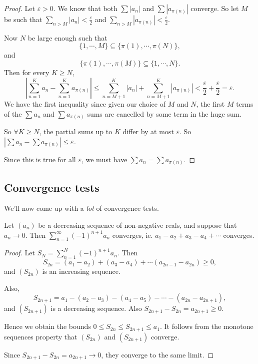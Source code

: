 \documentclass[a4paper]{article}
\begin{document}
\begin{proof}
  Let $\varepsilon > 0$. We know that both $\sum |a_n|$ and $\sum|a_{\pi(n)}|$ converge. So let $M$ be such that $\sum_{n > M}|a_n| < \frac{\varepsilon}{2}$ and $\sum_{n > M}|a_{\pi(n)}| < \frac{\varepsilon}{2}$.

  Now $N$ be large enough such that
  \[
    \{1, \cdots, M\}\subseteq \{\pi(1), \cdots, \pi(N)\},
  \]
  and
  \[
    \{\pi(1), \cdots, \pi(M)\}\subseteq \{1, \cdots, N\}.
  \]
  Then for every $K\geq N$,
  \[
    \left|\sum_{n = 1}^K a_n - \sum_{n = 1}^K a_{\pi(n)}\right| \leq \sum_{n = M + 1}^K |a_n| + \sum_{n = M + 1}^K |a_{\pi(n)}| < \frac{\varepsilon}{2} + \frac{\varepsilon}{2} = \varepsilon.
  \]
  We have the first inequality since given our choice of $M$ and $N$, the first $M$ terms of the $\sum a_n$ and $\sum a_{\pi(n)}$ sums are cancelled by some term in the huge sum.

  So $\forall K \geq N$, the partial sums up to $K$ differ by at most $\varepsilon$. So $|\sum a_n - \sum a_{\pi(n)}| \leq \varepsilon$.

  Since this is true for all $\varepsilon$, we must have $\sum a_n = \sum a_{\pi(n)}$.
\end{proof}

\subsection{Convergence tests}
We'll now come up with a \emph{lot} of convergence tests.
\begin{lemma}
  Let $(a_n)$ be a decreasing sequence of non-negative reals, and suppose that $a_n \to 0$. Then $\displaystyle \sum_{n = 1}^\infty (-1)^{n + 1}a_n$ converges, ie. $a_1 - a_2 + a_3 - a_4 + \cdots$ converges.
\end{lemma}

\begin{proof}
  Let $\displaystyle S_N = \sum_{n = 1}^N(-1)^{n + 1}a_n$. Then
  \[
    S_{2n} = (a_1 - a_2) + (a_3 - a_4) + \cdots (a_{2n - 1} - a_{2n}) \geq 0,
  \]
  and $(S_{2n})$ is an increasing sequence.

  Also,
  \[
    S_{2n + 1} = a_1 - (a_2 - a_3) - (a_4 - a_5) - \cdots - (a_{2n} - a_{2n + 1}),
  \]
  and $(S_{2n + 1})$ is a decreasing sequence. Also $S_{2n + 1} - S_{2n} = a_{2n + 1} \geq 0$.

  Hence we obtain the bounds $0 \leq S_{2n} \leq S_{2n + 1} \leq a_1$. It follows from the monotone sequences property that $(S_{2n})$ and $(S_{2n + 1})$ converge.

  Since $S_{2n + 1} - S_{2n} = a_{2n + 1} \to 0$, they converge to the same limit.
\end{proof}
\end{document}
